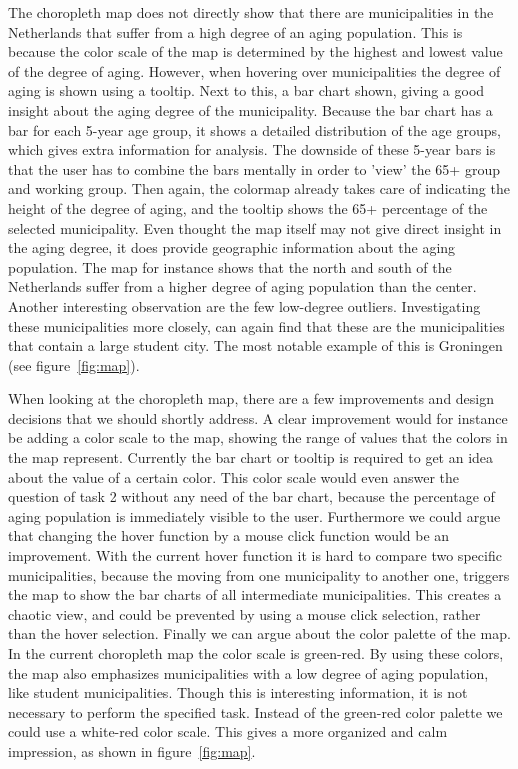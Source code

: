 The choropleth map does not directly show that there are municipalities in the Netherlands that suffer from a high degree of an aging population. This is because the color scale of the map is determined by the highest and lowest value of the degree of aging. However, when hovering over municipalities the degree of aging is shown using a tooltip. Next to this, a bar chart shown, giving a good insight about the aging degree of the municipality. Because the bar chart has a bar for each 5-year age group, it shows a detailed distribution of the age groups, which gives extra information for analysis. The downside of these 5-year bars is that the user has to combine the bars mentally in order to 'view' the 65+ group and working group. Then again, the colormap already takes care of indicating the height of the degree of aging, and the tooltip shows the 65+ percentage of the selected municipality. Even thought the map itself may not give direct insight in the aging degree, it does provide geographic information about the aging population. The map for instance shows that the north and south of the Netherlands suffer from a higher degree of aging population than the center. Another interesting observation are the few low-degree outliers. Investigating these municipalities more closely, can again find that these are the municipalities that contain a large student city. The most notable example of this is Groningen (see figure~\ref{fig:map}).

When looking at the choropleth map, there are a few improvements and design decisions that we should shortly address. A clear improvement would for instance be adding a color scale to the map, showing the range of values that the colors in the map represent. Currently the bar chart or tooltip is required to get an idea about the value of a certain color. This color scale would even answer the question of task 2 without any need of the bar chart, because the percentage of aging population is immediately visible to the user. Furthermore we could argue that changing the hover function by a mouse click function would be an improvement. With the current hover function it is hard to compare two specific municipalities, because the moving from one municipality to another one, triggers the map to show the bar charts of all intermediate municipalities. This creates a chaotic view, and could be prevented by using a mouse click selection, rather than the hover selection. Finally we can argue about the color palette of the map. In the current choropleth map the color scale is green-red. By using these colors, the map also emphasizes municipalities with a low degree of aging population, like student municipalities. Though this is interesting information, it is not necessary to perform the specified task. Instead of the green-red color palette we could use a white-red color scale. This gives a more organized and calm impression, as shown in figure~\ref{fig:map}.

